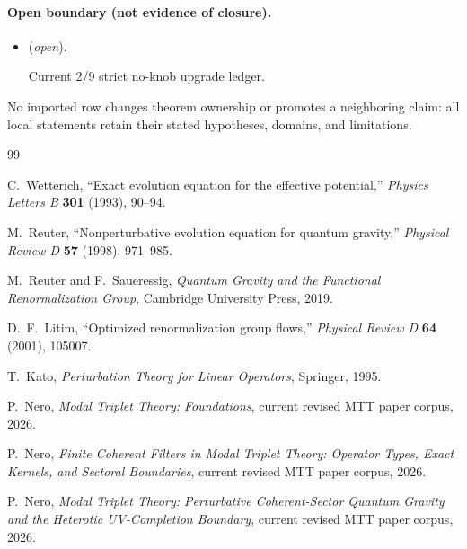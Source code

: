 \documentclass[11pt]{article}
\theoremstyle{definition}
\theoremstyle{remark}
\begin{document}
\paragraph{Open boundary (not evidence of closure).}
\begin{itemize}
\setlength{\itemsep}{0.25em}
\item {} (\emph{open}).\par Current 2/9 strict no-knob upgrade ledger.
\end{itemize}

No imported row changes theorem ownership or promotes a neighboring claim: all local statements retain their stated hypotheses, domains, and limitations.

\begin{thebibliography}{99}

C.~Wetterich,
``Exact evolution equation for the effective potential,''
\emph{Physics Letters B} \textbf{301} (1993), 90--94.

M.~Reuter,
``Nonperturbative evolution equation for quantum gravity,''
\emph{Physical Review D} \textbf{57} (1998), 971--985.

M.~Reuter and F.~Saueressig,
\emph{Quantum Gravity and the Functional Renormalization Group},
Cambridge University Press, 2019.

D.~F.~Litim,
``Optimized renormalization group flows,''
\emph{Physical Review D} \textbf{64} (2001), 105007.

T.~Kato,
\emph{Perturbation Theory for Linear Operators},
Springer, 1995.

P.~Nero,
\emph{Modal Triplet Theory: Foundations},
current revised MTT paper corpus, 2026.

P.~Nero,
\emph{Finite Coherent Filters in Modal Triplet Theory: Operator Types,
Exact Kernels, and Sectoral Boundaries},
current revised MTT paper corpus, 2026.

P.~Nero,
\emph{Modal Triplet Theory: Perturbative Coherent-Sector Quantum Gravity
and the Heterotic UV-Completion Boundary},
current revised MTT paper corpus, 2026.

\end{thebibliography}
\end{document}
